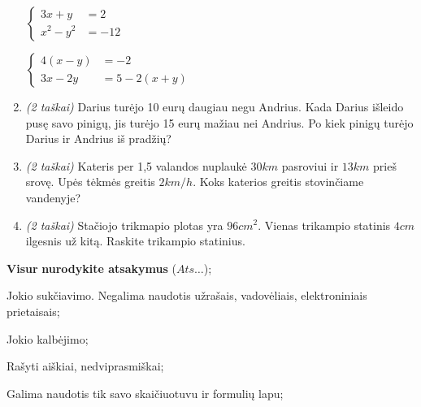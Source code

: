 \documentclass[a4paper]{article}
\begin{document}
\begin{enumerate}
\begin{tasks}[item-format={\normalfont}, after-item-skip=4mm]
                  \task   \par\vspace{-1.3\baselineskip}%
                  $\left\{\begin{aligned}
                              3x + y   & = 2   \\
                              x^2 -y^2 & = -12
                        \end{aligned}\right.$
                  \task   \par\vspace{-1.3\baselineskip}%
                  $\left\{\begin{aligned}
                              4(x - y) & = -2       \\
                              3x-2y    & = 5-2(x+y)
                        \end{aligned}\right.$
            \end{tasks}
      \item \textit{(2 taškai)} Darius turėjo 10 eurų daugiau negu Andrius. Kada Darius išleido pusę savo pinigų, jis turėjo 15 eurų mažiau nei Andrius. Po kiek pinigų turėjo Darius ir Andrius iš pradžių?
      \item \textit{(2 taškai)} Kateris per 1,5 valandos nuplaukė $30 km$ pasroviui ir $13 km$ prieš srovę. Upės tėkmės greitis $2 km/h$. Koks katerios greitis stovinčiame vandenyje?
      \item \textit{(2 taškai)} Stačiojo trikmapio plotas yra $96 cm^2$. Vienas trikampio statinis $4 cm$ ilgesnis už kitą. Raskite trikampio statinius.
\end{enumerate}

\begin{small}
      \begin{enumerate*}[label={(\arabic*)}]
            \item \textbf{Visur} \textbf{nurodykite atsakymus} ($Ats\ldots$);
            \item Jokio sukčiavimo. Negalima naudotis užrašais, vadovėliais, elektroniniais
                  prietaisais;
            \item Jokio kalbėjimo;
            \item Rašyti aiškiai, nedviprasmiškai;
            \item Galima naudotis tik savo skaičiuotuvu ir formulių lapu;
      \end{enumerate*}
\end{small}
\end{document}

